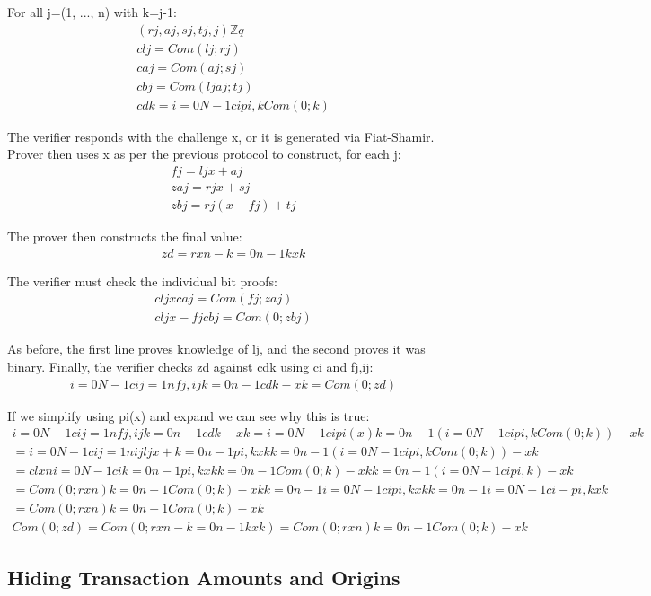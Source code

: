 \documentclass{article}
\begin{document}
For all j=(1, ..., n) with k=j-1:
\begin{eqnarray}
  (rj,aj,sj,tj,j) \mathbb{Z}q\\
  clj=Com(lj;rj)\\
  caj=Com(aj;sj)\\
  cbj=Com(ljaj;tj)\\
  cdk=i=0N-1cipi,k Com(0;k)
\end{eqnarray}

The verifier responds with the challenge x, or it is generated via Fiat-Shamir.  Prover then uses x as per the previous protocol to construct, for each j:
\begin{eqnarray}
  fj=ljx+aj\\
  zaj=rjx+sj\\
  zbj=rj(x-fj)+tj
\end{eqnarray}

The prover then constructs the final value:
\begin{eqnarray}
  zd=rxn-k=0n-1kxk
\end{eqnarray}

The verifier must check the individual bit proofs:
\begin{eqnarray}
  cljx caj=Com(fj;zaj)\\
  cljx-fjcbj=Com(0;zbj)
\end{eqnarray}
    
As before, the first line proves knowledge of lj, and the second proves it was binary.  Finally, the verifier checks zd against cdk using ci and fj,ij:
\begin{eqnarray}
  i=0N-1cij=1nfj,ij  k=0n-1cdk-xk=Com(0;zd)
\end{eqnarray}

If we simplify using pi(x) and expand we can see why this is true:
\begin{eqnarray}
  i=0N-1cij=1nfj,ij  k=0n-1cdk-xk=i=0N-1cipi(x)  k=0n-1 (i=0N-1cipi,k Com(0;k))-xk\\
  =i=0N-1cij=1nijljx+ k=0n-1pi,k xk  k=0n-1 (i=0N-1cipi,k Com(0;k))-xk\\
  =clxn i=0N-1cik=0n-1pi,k xk  k=0n-1Com(0;k)-xk k=0n-1(i=0N-1cipi,k)-xk\\
  =Com(0;rxn) k=0n-1Com(0;k)-xk  k=0n-1i=0N-1cipi,k xk  k=0n-1i=0N-1ci-pi,kxk\\
  =Com(0;rxn) k=0n-1Com(0;k)-xk\\
  Com(0;zd)=Com(0;rxn-k=0n-1kxk)=Com(0;rxn) k=0n-1Com(0;k)-xk
\end{eqnarray}


\subsection{Hiding Transaction Amounts and Origins}
 
\end{document}
